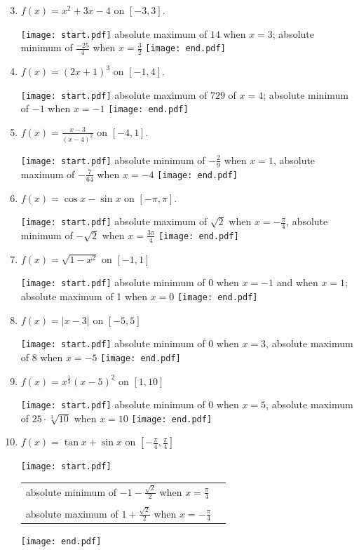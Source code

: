 \documentclass[12pt]{article}
\begin{document}
\begin{enumerate}
\setcounter{enumi}{2}

\item $f(x) = x^2+3x-4$ on $[-3,3]$. 

\texttt{[image: start.pdf]}
{{absolute maximum of $14$ when $x=3$; absolute minimum of $\frac{-25}{4}$ when $x=\frac{3}{2}$}}
\texttt{[image: end.pdf]}


\item $f(x) =(2x+1)^3$ on $[-1,4]$. 

\texttt{[image: start.pdf]}
{{absolute maximum of $729$ of $x=4$; absolute minimum of $-1$ when $x=-1$}}
\texttt{[image: end.pdf]}


\item $f(x) = \frac{x-3}{(x-4)^2}$ on $[-4,1]$. 

\texttt{[image: start.pdf]}
{{absolute minimum of $-\frac{2}{9}$ when $x=1$, absolute maximum of $-\frac{7}{64}$ when $x=-4$}}
\texttt{[image: end.pdf]}


\item $f(x) = \cos{x}-\sin{x}$ on $[-\pi,\pi]$. 

\texttt{[image: start.pdf]}
{{absolute maximum of $\sqrt{2}$ when $x=-\frac{\pi}{4}$, absolute minimum of $-\sqrt{2}$ when $x=\frac{3\pi}{4}$}}
\texttt{[image: end.pdf]}


\item $f(x) = \sqrt{1-x^2}$ on $[-1,1]$ 

\texttt{[image: start.pdf]}
{{absolute minimum of 0 when $x=-1$ and when $x=1$; absolute maximum of 1 when $x=0$}}
\texttt{[image: end.pdf]}


\item $f(x) = |x-3|$ on $[-5,5]$ 

\texttt{[image: start.pdf]}
{{absolute minimum of 0 when $x=3$, absolute maximum of 8 when $x=-5$}}
\texttt{[image: end.pdf]}


\item $f(x) = x^{\frac{1}{3}}(x-5)^2$ on $[1,10]$ 

\texttt{[image: start.pdf]}
{{absolute minimum of 0 when $x=5$, absolute maximum of $25 \cdot \sqrt[3]{10}$ when $x=10$}}
\texttt{[image: end.pdf]}


\item $f(x) = \tan{x}+\sin{x}$ on $\left[-\frac{\pi}{4}, \frac{\pi}{4}\right]$ 

\texttt{[image: start.pdf]}
{{\begin{tabular}{ll}
absolute minimum of $-1-\frac{\sqrt{2}}{2}$ when $x=\frac{\pi}{4}$\\
\\
absolute maximum of $1+\frac{\sqrt{2}}{2}$ when $x=-\frac{\pi}{4}$
\end{tabular}
}}
\texttt{[image: end.pdf]}



\end{enumerate}
\end{document}

